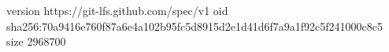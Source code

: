 version https://git-lfs.github.com/spec/v1
oid sha256:70a9416e760f87a6e4a102b95fc5d8915d2e1d41d6f7a9a1f92c5f241000c8c5
size 2968700
